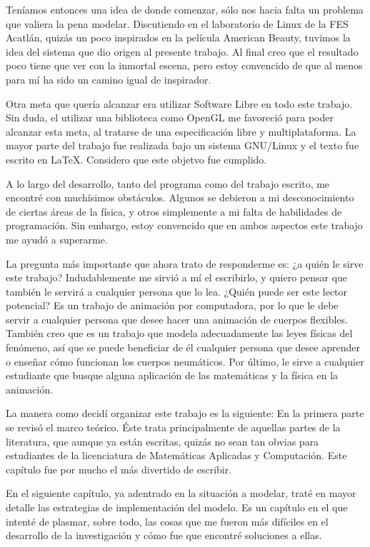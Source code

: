 Teníamos entonces una idea de donde comenzar, sólo nos hacia falta un problema que valiera la pena modelar.
Discutiendo en el laboratorio de Linux de la FES Acatlán, quizás un poco inspirados en la película American Beauty, tuvimos la idea del sistema que dio origen al presente trabajo.
Al final creo que el resultado poco tiene que ver con la inmortal escena, pero estoy convencido de que al menos para mí ha sido un camino igual de inspirador.

Otra meta que quería alcanzar era utilizar Software Libre en todo este trabajo. 
Sin duda, el utilizar una biblioteca como OpenGL me favoreció para poder alcanzar esta meta, al tratarse de una especificación libre y multiplataforma.
La mayor parte del trabajo fue realizada bajo un sistema GNU/Linux y el texto fue escrito en \LaTeX. Considero que este objetvo fue cumplido.

A lo largo del desarrollo, tanto del programa como del trabajo escrito, me encontré con muchísimos obstáculos.
Algunos se debieron a mi desconocimiento de ciertas áreas de la física, y otros simplemente a mi falta de habilidades de programación.
Sin embargo, estoy convencido que en ambos aspectos este trabajo me ayudó a superarme.

La pregunta más importante que ahora trato de responderme es: ¿a quién le sirve este trabajo?
Indudablemente me sirvió a mí el escribirlo, y quiero pensar que también le servirá a cualquier persona que lo lea.
¿Quién puede ser este lector potencial?
Es un trabajo de animación por computadora, por lo que le debe servir a cualquier persona que desee hacer una animación de cuerpos flexibles.
También creo que es un trabajo que modela adecuadamente las leyes físicas del fenómeno, así que se puede beneficiar de él cualquier persona que desee aprender o enseñar cómo funcionan los cuerpos neumáticos.
Por último, le sirve a cualquier estudiante que busque alguna aplicación de las matemáticas y la física en la animación.

La manera como decidí organizar este trabajo es la siguiente:
En la primera parte se revisó el marco teórico.
Éste trata principalmente de aquellas partes de la literatura, que aunque ya están escritas, quizás no sean tan obvias para estudiantes de la licenciatura de Matemáticas Aplicadas y Computación.
Este capítulo fue por mucho el más divertido de escribir.

En el siguiente capítulo, ya adentrado en la situación a modelar, traté en mayor detalle las estrategias de implementación del modelo.
Es un capítulo en el que intenté de plasmar, sobre todo, las cosas que me fueron más difíciles en el desarrollo de la investigación y cómo fue que encontré soluciones a ellas.

